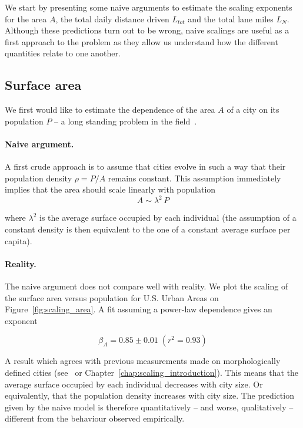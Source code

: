 We start by presenting some naive arguments to estimate the scaling exponents
for the area $A$, the total daily distance driven $L_{tot}$ and the total lane
miles $L_N$. Although these predictions turn out to be wrong, naive scalings are
useful as a first approach to the problem as they allow us understand how the
different quantities relate to one another.

\subsection{Surface area}

We first would like to estimate the dependence of the area
$A$ of a city on its population $P$ -- a long standing problem in the
field~\cite{Stewart:1947, Batty:2011}.

\paragraph{Naive argument.}  A first crude approach is to assume
that cities evolve in such a way that their population density $\rho = P/A$
remains constant. This assumption immediately implies that the area should
scale linearly with population
%
\begin{equation} 
    A \sim \lambda^2\, P 
    \label{eq:area_naive} 
\end{equation}

where $\lambda^2$ is the average surface occupied by each individual (the
assumption of a constant density is then equivalent to the one of a constant
average surface per capita).

\paragraph{Reality.} The naive argument does not compare well with reality. We
plot the scaling of the surface area versus population for U.S. Urban Areas on
Figure~\ref{fig:scaling_area}. A fit assuming a power-law dependence gives an exponent

\begin{equation}
    \boxed{\beta_A = 0.85 \pm 0.01\;(r^2 = 0.93)}
\end{equation}

A result which agrees with previous measurements made on morphologically defined
cities (see~\cite{Batty:2011} or Chapter~\ref{chap:scaling_introduction}). This means that the average surface occupied by each individual decreases with
city size. Or equivalently, that the population density increases with city size.
The prediction given by the naive model is therefore quantitatively -- and
worse, qualitatively -- different from the behaviour observed empirically.

